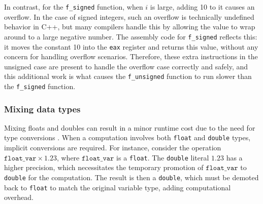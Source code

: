 \documentclass{article}
\theoremstyle{break}
\begin{document}
In contrast, for the \texttt{f\_signed} function, when \(i\) is large, adding 10 to it causes an overflow. In the case of signed integers, such an overflow is technically undefined behavior in C++, but many compilers handle this by allowing the value to wrap around to a large negative number. The assembly code for \texttt{f\_signed} reflects this: it moves the constant 10 into the \texttt{eax} register and returns this value, without any concern for handling overflow scenarios. Therefore, these extra instructions in the unsigned case are present to handle the overflow case correctly and safely, and this additional work is what causes the \texttt{f\_unsigned} function to run slower than the \texttt{f\_signed} function.



\subsubsection*{Mixing data types}


Mixing floats and doubles can result in a minor runtime cost due to the need for type conversions \cite{14}. When a computation involves both \texttt{float} and \texttt{double} types, implicit conversions are required. For instance, consider the operation \(\texttt{float\_var} \times 1.23\), where \(\texttt{float\_var}\) is a \texttt{float}. The \texttt{double} literal \(1.23\) has a higher precision, which necessitates the temporary promotion of \(\texttt{float\_var}\) to \texttt{double} for the computation. The result is then a \texttt{double}, which must be demoted back to \texttt{float} to match the original variable type, adding computational overhead.
\end{document}
